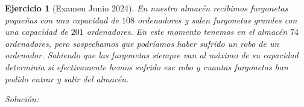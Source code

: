 \documentclass{amsart}
\newtheorem{ejer}{Ejercicio}
\begin{document}
\begin{ejer}[Examen Junio 2024]
En nuestro almacén recibimos furgonetas pequeñas con una capacidad de $108$ ordenadores y 
salen furgonetas grandes con una capacidad de $201$ ordenadores. En este momento 
tenemos en el almacén $74$ ordenadores, pero sospechamos que podríamos haber sufrido
un robo de un ordenador. Sabiendo que las furgonetas siempre van al máximo de su 
capacidad determinia si efectivamente hemos sufrido ese robo y cuantas furgonetas 
han podido entrar y salir del almacén.
\end{ejer}

{\it Solución: }


\end{document}
